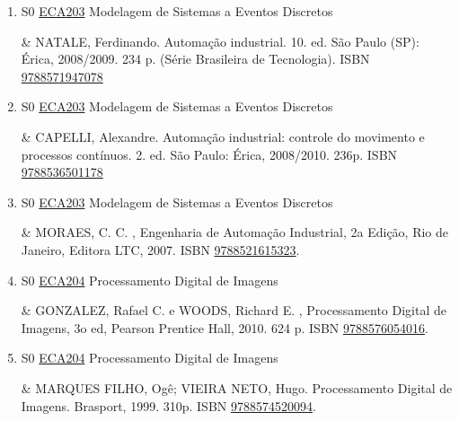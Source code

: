 \documentclass[12pt,a4paper]{book}
\begin{document}
\begin{enumerate}
&  RAMALHO, G. L. B..  Redes de Petri.  Apostila (Projeto TICS).  2011. 
 

 \item S0 \hyperref[PUD:ECA203]{ECA203} Modelagem de Sistemas a Eventos Discretos

&  NATALE, Ferdinando.  Automação industrial.  10. ed.  São Paulo (SP): Érica, 2008/2009.  234 p.  (Série Brasileira de Tecnologia).  ISBN \href{http://www.bn.br/site/pages/servicosProfissionais/agenciaISBN/isbnBusca/FbnBuscaISBNCatalogo.asp?pField=ISBN&pIntPagina=1&pISBN=71947078&nidbISBN=true&hidbISBN=true}{9788571947078}
 

 \item S0 \hyperref[PUD:ECA203]{ECA203} Modelagem de Sistemas a Eventos Discretos

&  CAPELLI, Alexandre.  Automação industrial: controle do movimento e processos contínuos.  2. ed.  São Paulo: Érica, 2008/2010.  236p.    ISBN \href{http://www.bn.br/site/pages/servicosProfissionais/agenciaISBN/isbnBusca/FbnBuscaISBNCatalogo.asp?pField=ISBN&pIntPagina=1&pISBN=36501178&nidbISBN=true&hidbISBN=true}{9788536501178}
 

 \item S0 \hyperref[PUD:ECA203]{ECA203} Modelagem de Sistemas a Eventos Discretos

&  MORAES, C.  C. , Engenharia de Automação Industrial, 2a Edição, Rio de Janeiro, Editora LTC, 2007.  ISBN \href{http://www.bn.br/site/pages/servicosProfissionais/agenciaISBN/isbnBusca/FbnBuscaISBNCatalogo.asp?pField=ISBN&pIntPagina=1&pISBN=21615323&nidbISBN=true&hidbISBN=true}{9788521615323}.
 \item S0 \hyperref[PUD:ECA204]{ECA204} Processamento Digital de Imagens

&  GONZALEZ, Rafael C.  e WOODS, Richard E. , Processamento Digital de Imagens, 3o ed,  Pearson Prentice Hall, 2010.  624 p.  ISBN \href{http://www.bn.br/site/pages/servicosProfissionais/agenciaISBN/isbnBusca/FbnBuscaISBNCatalogo.asp?pField=ISBN&pIntPagina=1&pISBN=76054016&nidbISBN=true&hidbISBN=true}{9788576054016}. 

 

 \item S0 \hyperref[PUD:ECA204]{ECA204} Processamento Digital de Imagens

&   MARQUES FILHO, Ogê;  VIEIRA NETO, Hugo.  Processamento Digital de Imagens.  Brasport, 1999.  310p.  ISBN \href{http://www.bn.br/site/pages/servicosProfissionais/agenciaISBN/isbnBusca/FbnBuscaISBNCatalogo.asp?pField=ISBN&pIntPagina=1&pISBN=74520094&nidbISBN=true&hidbISBN=true}{9788574520094}. 


\end{enumerate}
\end{document}
